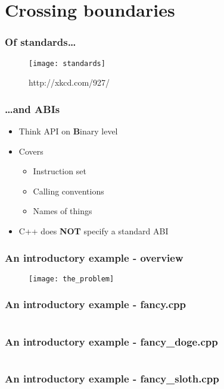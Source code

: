 \section{Crossing boundaries}

\begin{frame}[c]
  \frametitle{Of standards\ldots{}}
  \begin{figure}
    \centering
    \texttt{[image: standards]}
    \caption{http://xkcd.com/927/}
  \end{figure}
\end{frame}

\begin{frame}[c]
  \frametitle{\ldots{}and ABIs}\pause{}
  \begin{itemize}
    \item{Think API on \textbf{B}inary level}\pause{}
    \item{Covers}\pause{}
      \begin{itemize}
        \item{Instruction set}\pause{}
        \item{Calling conventions}\pause{}
        \item{Names of things}\pause{}
      \end{itemize}
    \item{C++ does \textbf{NOT} specify a standard ABI}
  \end{itemize}
\end{frame}

\begin{frame}[c]
  \frametitle{An introductory example - overview}
  \begin{figure}
    \centering
    \texttt{[image: the\_problem]}
  \end{figure}
\end{frame}

\begin{frame}[c]
  \frametitle{An introductory example - fancy.cpp}
  \inputminted{cpp}{code/fancy1/fancy.cpp}
\end{frame}

\begin{frame}[c]
  \frametitle{An introductory example - fancy\_doge.cpp}
  \inputminted{cpp}{code/fancy1/fancy_doge.cpp}
\end{frame}

\begin{frame}[c]
  \frametitle{An introductory example - fancy\_sloth.cpp}
  \inputminted{cpp}{code/fancy1/fancy_sloth.cpp}
\end{frame}

